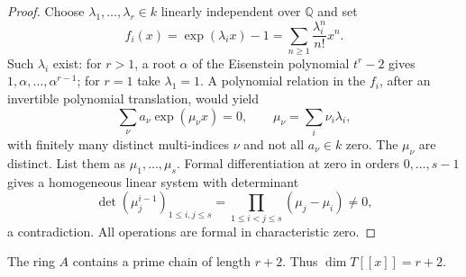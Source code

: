 \begin{proof}
Choose $\lambda_1,\ldots,\lambda_r\in k$ linearly independent
over $\mathbb Q$ and set
\[
 f_i(x)=\exp(\lambda_i x)-1
       =\sum_{n\ge1}\frac{\lambda_i^n}{n!}x^n.
\]
Such $\lambda_i$ exist: for $r>1$, a root $\alpha$ of the
Eisenstein polynomial $t^r-2$ gives $1,\alpha,\ldots,\alpha^{r-1}$;
for $r=1$ take $\lambda_1=1$.
A polynomial relation in the $f_i$, after an invertible polynomial
translation, would yield
\[
 \sum_{\nu}a_\nu\exp(\mu_\nu x)=0,
 \qquad \mu_\nu=\sum_i\nu_i\lambda_i,
\]
with finitely many distinct multi-indices $\nu$ and not all
$a_\nu\in k$ zero. The $\mu_\nu$ are distinct. List them as
$\mu_1,\ldots,\mu_s$. Formal differentiation at zero in orders
$0,\ldots,s-1$ gives a homogeneous linear system with determinant
\[
 \det(\mu_j^{i-1})_{1\le i,j\le s}
   =\prod_{1\le i<j\le s}(\mu_j-\mu_i)\ne0,
\]
a contradiction. All operations are formal in characteristic zero.
\end{proof}

\begin{proposition}\label{prop:lower}
The ring $A$ contains a prime chain of length $r+2$.
Thus $\dim T[[x]]=r+2$.
\end{proposition}

